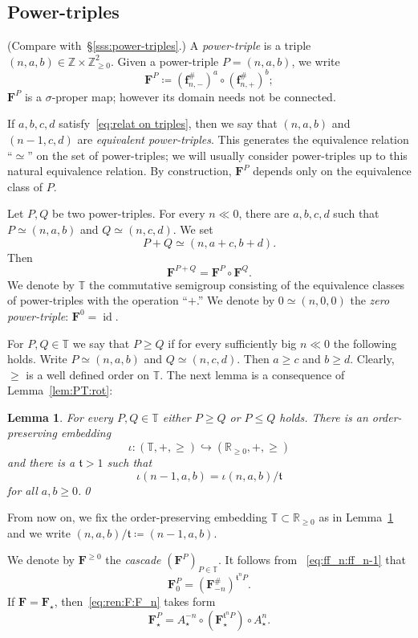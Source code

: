 \documentclass{amsart}
\newcommand{\1}{{\mathbb 1 }}
\newcommand\PT{\mathbb{ T}}
\newcommand{\bF}{{\mathbf F}}
\newcommand{\bbf}{{\mathbf f}}
\newcommand{\str}{{\star}}
\renewcommand{\tt}{\mathfrak{t}}
\newcommand{\R}{\mathbb{R}}
\newcommand{\Z}{\mathbb{Z}}
\newtheorem{lem}[thm]{Lemma}
\theoremstyle{remark}
\numberwithin{equation}{section}
\theoremstyle{definition}
\newcommand{\id}{\operatorname{id}}
\theoremstyle{nonumberbreak}
\begin{document}
\subsection{Power-triples} (Compare with~\S\ref{sss:power-triples}.)
\label{ss:PowerTriples}
A \emph{power-triple} is a triple $(n,a,b)\in \Z\times \Z^2_{\ge 0}$. Given a power-triple $P=(n,a,b)$, we write
\[\bF^{P}\coloneqq \left(\bbf^\#_{n,-}\right)^a\circ \left(\bbf^\#_{n,+}\right)^b;\]
$\bF^{P}$ is a $\sigma$-proper map; however its domain needs not be connected.

If $a,b,c,d$ satisfy~\eqref{eq:relat on triples}, then we say that $(n,a,b)$ and $(n-1,c,d)$ are \emph{equivalent power-triples}. This generates the equivalence relation ``$\simeq$'' on the set of power-triples; we will usually consider power-triples up to this natural equivalence relation. By construction, $\bF^P$ depends only on the equivalence class of $P$. 


Let $P,Q$ be two power-triples. For every $n\ll0$, there are $a,b,c,d$ such that $P\simeq (n,a,b) $ and $Q\simeq (n,c,d) $. We set 
\[P+Q\simeq (n,a+c,b+d).\]
Then \[\bF^{P+Q}= \bF^{P}\circ \bF^{Q}.\]
We denote by $\PT$ the commutative semigroup consisting of the equivalence classes of power-triples with the operation ``$+$.'' We denote by $0\simeq (n,0,0)$ the \emph{zero power-triple}:  $\bF^0=\id$. 








 For $P,Q\in \PT$ we say that $P\ge Q$ if for every sufficiently big $n\ll 0$ the following holds. Write $P\simeq (n,a,b)$ and $Q\simeq (n,c,d)$. Then $a\ge c$ and $b\ge d$. Clearly, $\ge$ is a well defined order on $\PT$. The next lemma is a consequence of Lemma~\ref{lem:PT:rot}:
 





\begin{lem}
\label{lem:power-triples:order}
For every $P,Q\in \PT$ either $P\ge Q$ or $P\le Q$ holds. There is an order-preserving embedding 
\[\iota\colon (\PT,+,\ge)\hookrightarrow (\R_{\ge 0},+,\ge)\]
and there is a $\tt>1$ such that 
\[
\iota(n-1,a,b)= \iota(n,a,b)/\tt\]
 for all $a,b\ge0$.\qed
\end{lem}


From now on, we fix the order-preserving embedding $\PT\subset \R_{\ge0}$ as in Lemma~\ref{lem:power-triples:order} and we write $(n,a,b)/\tt \coloneqq (n-1,a,b).$

 We denote by $\bF^{\ge 0}$ the \emph{cascade} $(\bF^P)_{P\in \PT}$.  It follows from ~\eqref{eq:ff_n:ff_n-1} that
\begin{equation}
\label{eq:ren:F:F_n}
 \bF_0^P=\left(\bF^{\#}_{-n} \right)^{\tt^n P}.
\end{equation}
If $\bF=\bF_\str$, then~\eqref{eq:ren:F:F_n} takes form
 \begin{equation}
\label{eq:ren:F:F_n^P}
 \bF_\str^P=A_\str^{-n} \circ \left(\bF_{\str}^{\tt^n P} \right) \circ A_\str^{n}.
\end{equation}
\end{document}
